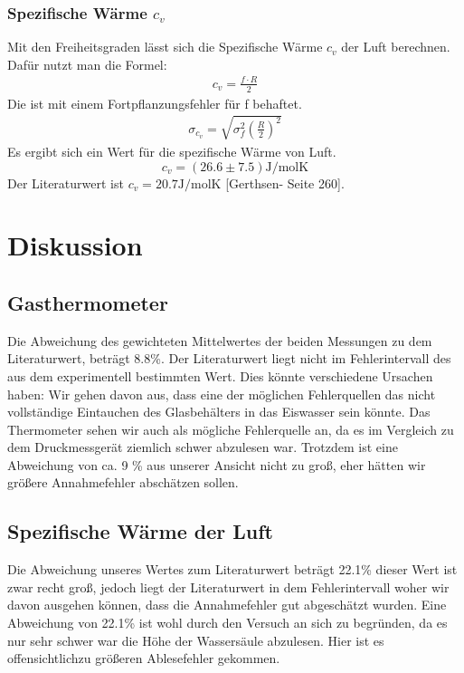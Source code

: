 \documentclass[12pt,a4paper,titlepage,headinclude,bibtotoc]{scrartcl}
\begin{document}
\subsubsection{Spezifische Wärme $c_v$}
Mit den Freiheitsgraden lässt sich die Spezifische Wärme $c_v$ der Luft berechnen.
Dafür nutzt man die Formel:
\begin{align}
	c_v=\frac{f\cdot R}{2}
\end{align}
Die ist mit einem Fortpflanzungsfehler  für f behaftet. 
\begin{align}
	\sigma_{c_v}= \sqrt{\sigma_f^2\left(\frac{R}{2}\right)^2}
\end{align}
Es ergibt sich ein Wert für die spezifische Wärme von Luft.
$$c_v=(26.6\pm7.5)\si{\joule/\mol\kelvin}$$
Der Literaturwert ist $c_v=20.7\si{\joule/\mol\kelvin}$ [Gerthsen- Seite 260].

\section{Diskussion}
\label{sec:diskussion}
\subsection{Gasthermometer}
Die Abweichung des gewichteten Mittelwertes der beiden Messungen zu dem Literaturwert, beträgt 8.8\%. Der Literaturwert liegt nicht im Fehlerintervall des aus dem experimentell bestimmten Wert.
Dies könnte verschiedene Ursachen haben: Wir gehen davon aus, dass eine der möglichen Fehlerquellen das nicht vollständige Eintauchen des Glasbehälters in das Eiswasser sein könnte. Das Thermometer sehen wir auch als mögliche Fehlerquelle an, da es im Vergleich zu dem Druckmessgerät ziemlich schwer abzulesen war. Trotzdem ist eine Abweichung von ca. 9 \% aus unserer Ansicht nicht zu groß, eher hätten wir größere Annahmefehler abschätzen sollen. 


\subsection{Spezifische Wärme der Luft}
Die Abweichung unseres Wertes zum Literaturwert beträgt 22.1\% dieser Wert ist zwar recht groß, jedoch liegt der Literaturwert in dem Fehlerintervall woher wir davon ausgehen können, dass die Annahmefehler gut abgeschätzt wurden. Eine Abweichung von 22.1\% ist wohl durch den Versuch an sich zu begründen, da es nur sehr schwer war die Höhe der Wassersäule  abzulesen. Hier ist es offensichtlichzu größeren Ablesefehler gekommen.


\end{document}
